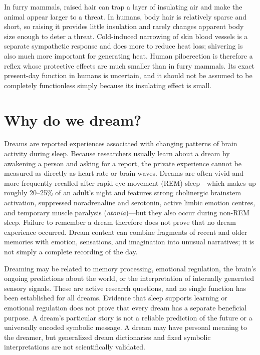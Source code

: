 \documentclass[11pt,oneside]{report}
\begin{document}
In furry mammals, raised hair can trap a layer of insulating air and make the
animal appear larger to a threat. In humans, body hair is relatively sparse and
short, so raising it provides little insulation and rarely changes apparent
body size enough to deter a threat. Cold-induced narrowing of skin blood vessels
is a separate sympathetic response and does more to reduce heat loss; shivering
is also much more important for generating heat. Human piloerection is therefore
a reflex whose protective effects are much smaller than in furry mammals. Its
exact present-day function in humans is uncertain, and it should not be assumed
to be completely functionless simply because its insulating effect is small.

\section{Why do we dream?}

Dreams are reported experiences associated with changing patterns of brain
activity during sleep. Because researchers usually learn about a dream by
awakening a person and asking for a report, the private experience cannot be
measured as directly as heart rate or brain waves. Dreams are often vivid and
more frequently recalled after rapid-eye-movement (REM) sleep—which makes up
roughly 20--25\% of an adult's night and features strong cholinergic brainstem
activation, suppressed noradrenaline and serotonin, active limbic emotion
centres, and temporary muscle paralysis (\emph{atonia})—but they also occur
during non-REM sleep. Failure to remember a dream therefore does not prove
that no dream experience occurred. Dream content can combine fragments of
recent and older memories with emotion, sensations, and imagination into unusual
narratives; it is not simply a complete recording of the day.

Dreaming may be related to memory processing, emotional regulation, the brain's
ongoing predictions about the world, or the interpretation of internally
generated sensory signals. These are active research questions, and no single
function has been established for all dreams. Evidence that sleep supports
learning or emotional regulation does not prove that every dream has a separate
beneficial purpose. A dream's particular story is not a reliable prediction of
the future or a universally encoded symbolic message. A dream may have personal
meaning to the dreamer, but generalized dream dictionaries and fixed symbolic
interpretations are not scientifically validated.
\end{document}

